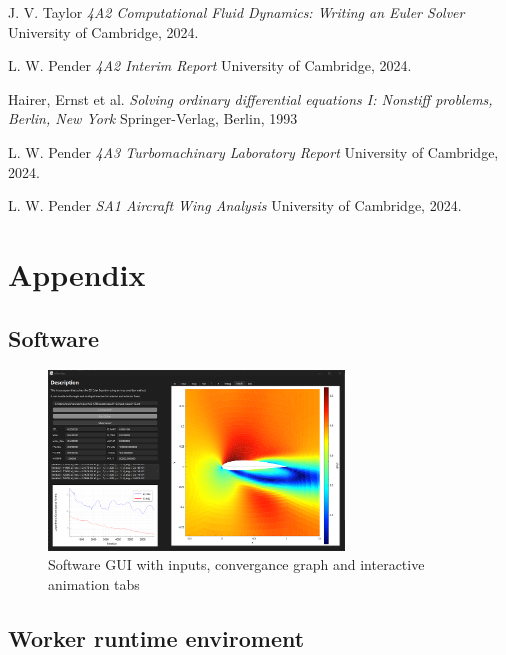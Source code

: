 \documentclass{article}
\begin{document}
\begin{thebibliography}{9}

    J. V. Taylor
    \emph{4A2 Computational Fluid Dynamics: Writing an Euler Solver}
    University of Cambridge,
    2024.

    L. W. Pender
    \emph{4A2 Interim Report}
    University of Cambridge,
    2024.

    Hairer, Ernst et al.
    \emph{Solving ordinary differential equations I: Nonstiff problems, Berlin, New York}
    Springer-Verlag, Berlin, 1993

    L. W. Pender
    \emph{4A3 Turbomachinary Laboratory Report}
    University of Cambridge,
    2024.

    L. W. Pender
    \emph{SA1 Aircraft Wing Analysis}
    University of Cambridge,
    2024.
  
\end{thebibliography}

\section{Appendix}

\subsection{Software}

\begin{figure}[H]
    \centering
    \includegraphics[width=0.7\textwidth]{figures/software.png}
    \caption{Software GUI with inputs, convergance graph and interactive animation tabs}
    \label{fig:software}
\end{figure}

\subsection{Worker runtime enviroment}
\end{document}
